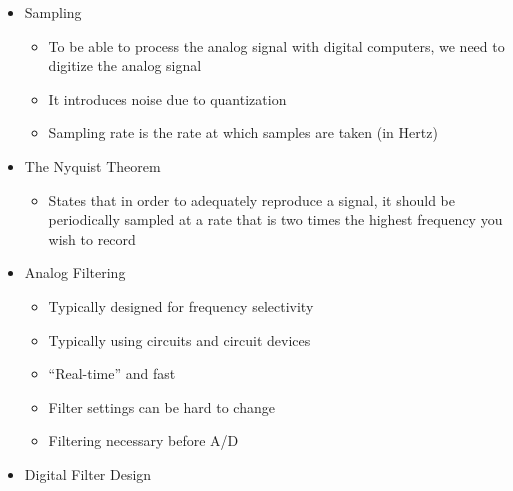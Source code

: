 \begin{itemize}

  \item Sampling

    \begin{itemize}

      \item To be able to process the analog signal with digital computers, we need to digitize the analog signal

      \item It introduces noise due to quantization

      \item Sampling rate is the rate at which samples are taken (in Hertz)

    \end{itemize}

  \item The Nyquist Theorem

    \begin{itemize}

      \item States that in order to adequately reproduce a signal, it should be periodically sampled at a rate that is two times the highest frequency you wish to record

    \end{itemize}

  \item Analog Filtering

    \begin{itemize}

      \item Typically designed for frequency selectivity

      \item Typically using circuits and circuit devices

      \item ``Real-time'' and fast

      \item Filter settings can be hard to change

      \item Filtering necessary before A/D

    \end{itemize}

  \item Digital Filter Design

    \begin{itemize}


\end{itemize}
\end{itemize}
